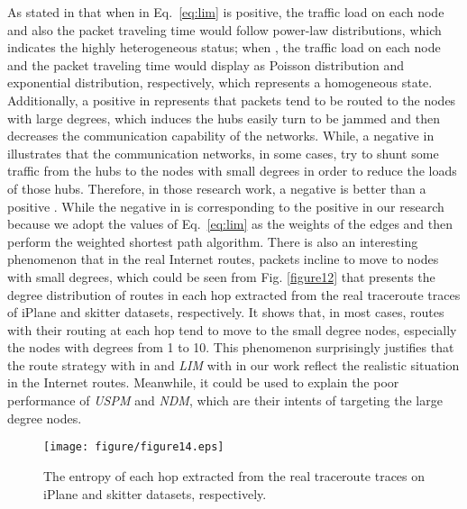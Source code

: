 \documentclass[a4paper]{llncs}
\begin{document}
As stated in
\cite{TrafficDynamicLocal,EfficientRouting}
that when  in Eq.~\ref{eq:lim} is positive, the traffic
load on each node and also the packet traveling time would follow power-law
distributions, which indicates the highly heterogeneous status; when
, the traffic load on each node and the packet traveling
time would display as Poisson distribution and exponential
distribution, respectively, which represents a homogeneous state.
Additionally, a positive  in \cite{TrafficDynamicLocal,EfficientRouting} represents that packets tend to be routed
to the nodes with large degrees, which induces the hubs easily turn
to be jammed and then decreases the communication capability of the
networks. While, a negative  in \cite{TrafficDynamicLocal,EfficientRouting} illustrates that the
communication networks, in some cases, try to shunt some traffic
from the hubs to the nodes with small degrees in order to reduce the
loads of those hubs. Therefore, in those research work, a negative  is better than a
positive . While the negative  in \cite{TrafficDynamicLocal,EfficientRouting} is corresponding to the positive  in our research because we adopt the values of Eq.~\ref{eq:lim}
as the weights of the edges and then perform the weighted shortest
path algorithm. There is also an interesting phenomenon that
in the real Internet routes, packets incline to move to nodes
with small degrees, which could be seen from Fig. \ref{figure12}
that presents the degree distribution of routes in each hop
extracted from the real traceroute traces of iPlane and skitter
datasets, respectively. It shows that, in most cases, routes with their routing at each hop tend to move
to the small degree nodes, especially the nodes with degrees from 1 to 10.
This phenomenon surprisingly justifies that the route strategy with  in \cite{TrafficDynamicLocal,EfficientRouting}
and \textit{LIM} with  in our work reflect the realistic
situation in the Internet routes. Meanwhile, it could be used to
explain the poor performance of \textit{USPM} and \textit{NDM}, which are
their intents of targeting the large degree nodes.


\begin{figure}[!t]
\centering
\texttt{[image: figure/figure14.eps]}
\vspace{-1.7em}
\caption{The entropy of each hop  extracted from the real traceroute traces on iPlane and skitter datasets, respectively.}
\label{figure14}
\vspace{-0.5em}
\end{figure}
\end{document}
